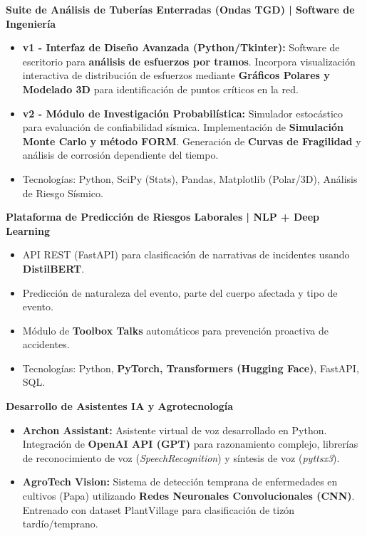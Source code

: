 \documentclass[10pt, a4paper]{article}
\begin{document}
\vspace{2mm}

\textbf{Suite de Análisis de Tuberías Enterradas (Ondas TGD) | Software de Ingeniería}
\begin{itemize}
    \item \textbf{v1 - Interfaz de Diseño Avanzada (Python/Tkinter):} Software de escritorio para \textbf{análisis de esfuerzos por tramos}. Incorpora visualización interactiva de distribución de esfuerzos mediante \textbf{Gráficos Polares y Modelado 3D} para identificación de puntos críticos en la red.
    \item \textbf{v2 - Módulo de Investigación Probabilística:} Simulador estocástico para evaluación de confiabilidad sísmica. Implementación de \textbf{Simulación Monte Carlo y método FORM}. Generación de \textbf{Curvas de Fragilidad} y análisis de corrosión dependiente del tiempo.
    \item Tecnologías: Python, SciPy (Stats), Pandas, Matplotlib (Polar/3D), Análisis de Riesgo Sísmico.
\end{itemize}

\vspace{2mm}

\textbf{Plataforma de Predicción de Riesgos Laborales | NLP + Deep Learning}
\begin{itemize}
    \item API REST (FastAPI) para clasificación de narrativas de incidentes usando \textbf{DistilBERT}.
    \item Predicción de naturaleza del evento, parte del cuerpo afectada y tipo de evento.
    \item Módulo de \textbf{Toolbox Talks} automáticos para prevención proactiva de accidentes.
    \item Tecnologías: Python, \textbf{PyTorch, Transformers (Hugging Face)}, FastAPI, SQL.
\end{itemize}

\vspace{2mm}

\textbf{Desarrollo de Asistentes IA y Agrotecnología}
\begin{itemize}
    \item \textbf{Archon Assistant:} Asistente virtual de voz desarrollado en Python. Integración de \textbf{OpenAI API (GPT)} para razonamiento complejo, librerías de reconocimiento de voz (\textit{SpeechRecognition}) y síntesis de voz (\textit{pyttsx3}).
    \item \textbf{AgroTech Vision:} Sistema de detección temprana de enfermedades en cultivos (Papa) utilizando \textbf{Redes Neuronales Convolucionales (CNN)}. Entrenado con dataset PlantVillage para clasificación de tizón tardío/temprano.
\end{itemize}
\end{document}
